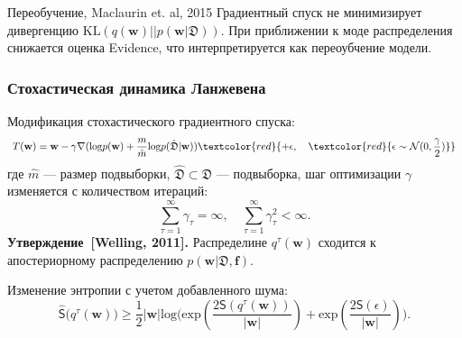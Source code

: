 \documentclass[10pt,pdf,utf8,russian,aspectratio=169]{beamer}
\begin{document}
\begin{frame}{Переобучение,  Maclaurin et. al, 2015}
Градиентный спуск не минимизирует дивергенцию $\text{KL}(q(\mathbf{w})||p(\mathbf{w}| \mathfrak{D}))$. При приближении к моде распределения снижается оценка Evidence, что интерпретируется как переоубчение модели.

\begin{figure}
  \centering
\label{fig:1}\qquad
\end{figure}
\end{frame}

\begin{frame}
\frametitle{Стохастическая динамика Ланжевена}
Модификация стохастического градиентного спуска:
\[
	T(\mathbf{w})=\mathbf{w} -  \gamma \nabla (\text{log}p(\mathbf{w})+\frac{m}{\hat{m}}\text{log}p(\hat{\mathfrak{D}}|\mathbf{w}))  \textcolor{red}{+ \epsilon, \quad   \textcolor{red}{\epsilon \sim  \mathcal{N}({0},{\frac{\gamma}{2}})}}
\]
где $\hat{m}$ --- размер подвыборки,  $\hat{\mathfrak{D}} \subset \mathfrak{D}$ --- подвыборка, шаг оптимизации $\gamma$ изменяется с количеством итераций:
\[
	\sum_{\tau=1}^\infty \gamma_\tau = \infty, \quad \sum_{\tau=1}^\infty \gamma_\tau^2 < \infty.
\]
\textbf{Утверждение~[Welling, 2011].} Распределине $q^\tau(\mathbf{w})$ сходится к апостериорному распределению $p(\mathbf{w} | \mathfrak{D},\mathbf{f})$.


Изменение энтропии с учетом добавленного шума:
\[
\hat{\mathsf{S}}\bigl(q^\tau(\mathbf{w})\bigr)   \geq \frac{1}{2}|\mathbf{w}|\text{log}\bigl(\text{exp}(\frac{2\mathsf{S}(q^\tau(\mathbf{w}))}{|\mathbf{w}|}) + \text{exp}(\frac{2\mathsf{S}( \epsilon)}{|\mathbf{w}|})\bigr).
\]

\end{frame}
\end{document}
